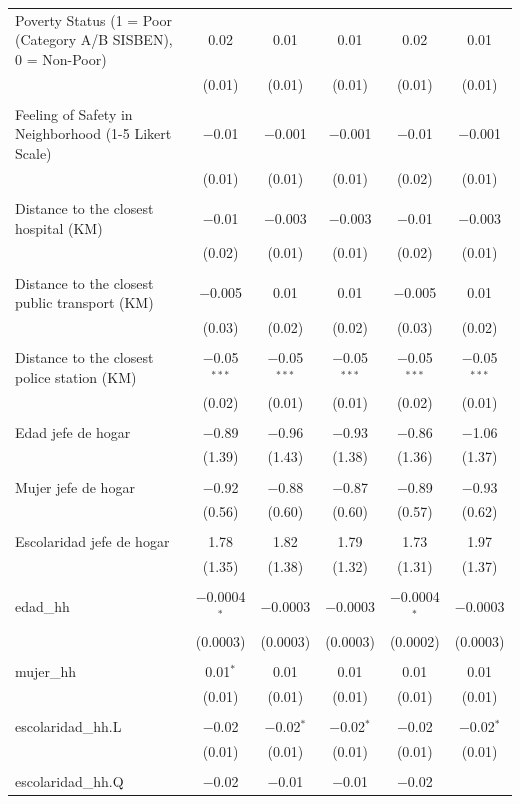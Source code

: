 \begin{table}[H]
\begin{tabularx}{0.9\textwidth}{@{\extracolsep{-7pt}}lccccc}
 Poverty Status (1 = Poor (Category A/B SISBEN), 0 = Non-Poor) & 0.02 & 0.01 & 0.01 & 0.02 & 0.01 \\    & (0.01) & (0.01) & (0.01) & (0.01) & (0.01) \\    & & & & & \\   Feeling of Safety in Neighborhood (1-5 Likert Scale) & $-$0.01 & $-$0.001 & $-$0.001 & $-$0.01 & $-$0.001 \\    & (0.01) & (0.01) & (0.01) & (0.02) & (0.01) \\    & & & & & \\   Distance to the closest hospital (KM) & $-$0.01 & $-$0.003 & $-$0.003 & $-$0.01 & $-$0.003 \\    & (0.02) & (0.01) & (0.01) & (0.02) & (0.01) \\    & & & & & \\   Distance to the closest public transport  (KM) & $-$0.005 & 0.01 & 0.01 & $-$0.005 & 0.01 \\    & (0.03) & (0.02) & (0.02) & (0.03) & (0.02) \\    & & & & & \\   Distance to the closest police station (KM) & $-$0.05$^{***}$ & $-$0.05$^{***}$ & $-$0.05$^{***}$ & $-$0.05$^{***}$ & $-$0.05$^{***}$ \\    & (0.02) & (0.01) & (0.01) & (0.02) & (0.01) \\    & & & & & \\   Edad jefe de hogar & $-$0.89 & $-$0.96 & $-$0.93 & $-$0.86 & $-$1.06 \\    & (1.39) & (1.43) & (1.38) & (1.36) & (1.37) \\    & & & & & \\   Mujer jefe de hogar & $-$0.92 & $-$0.88 & $-$0.87 & $-$0.89 & $-$0.93 \\    & (0.56) & (0.60) & (0.60) & (0.57) & (0.62) \\    & & & & & \\   Escolaridad jefe de hogar & 1.78 & 1.82 & 1.79 & 1.73 & 1.97 \\    & (1.35) & (1.38) & (1.32) & (1.31) & (1.37) \\    & & & & & \\   edad\_hh & $-$0.0004$^{*}$ & $-$0.0003 & $-$0.0003 & $-$0.0004$^{*}$ & $-$0.0003 \\    & (0.0003) & (0.0003) & (0.0003) & (0.0002) & (0.0003) \\    & & & & & \\   mujer\_hh & 0.01$^{*}$ & 0.01 & 0.01 & 0.01 & 0.01 \\    & (0.01) & (0.01) & (0.01) & (0.01) & (0.01) \\    & & & & & \\   escolaridad\_hh.L & $-$0.02 & $-$0.02$^{*}$ & $-$0.02$^{*}$ & $-$0.02 & $-$0.02$^{*}$ \\    & (0.01) & (0.01) & (0.01) & (0.01) & (0.01) \\    & & & & & \\   escolaridad\_hh.Q & $-$0.02 & $-$0.01 & $-$0.01 & $-$0.02 & 
\end{tabularx}
\end{table}
